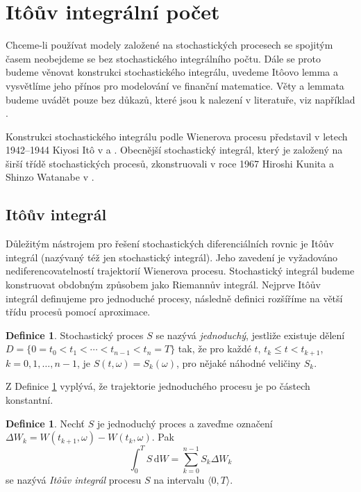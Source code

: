\documentclass[a4paper,12pt]{report}
\theoremstyle{definition} \newtheorem{definice}[veta]{Definice}
\theoremstyle{remark}
\begin{document}
\section{It\^oův integrální počet}\label{Ito_kalkul}
Chceme-li používat modely založené na stochastických procesech se spojitým časem neobejdeme se bez stochastického integrálního počtu.
Dále se proto budeme věnovat konstrukci stochastického integrálu, uvedeme It\^oovo lemma a vysvětlíme jeho přínos pro modelování ve finanční matematice.
Věty a lemmata budeme uvádět pouze bez důkazů, které jsou k nalezení v literatuře, viz například \cite{karatzas2012brownian}.

Konstrukci stochastického integrálu podle Wienerova procesu představil v letech 1942--1944 Kiyosi It\^o v \cite{ito1942differential} a \cite{ito1944}. 
Obecnější stochastický integrál, který je založený na širší třídě stochastických procesů, zkonstruovali v roce 1967 Hiroshi Kunita a Shinzo Watanabe v \cite{kunita1967square}.

\subsection{It\^oův integrál}\label{Ito_integral}
Důležitým nástrojem pro řešení stochastických diferenciálních rovnic je It\^oův integrál (nazývaný též jen stochastický integrál).
Jeho zavedení je vyžadováno nediferencovatelností trajektorií Wienerova procesu.
Stochastický integrál budeme konstruovat obdobným způsobem jako Riemannův integrál.
Nejprve It\^oův integrál definujeme pro jednoduché procesy, následně definici rozšíříme na větší třídu procesů pomocí aproximace.

\begin{definice}\label{jednoduchafunkce}
Stochastický proces $S$ se nazývá \textit{jednoduchý}, %
jestliže existuje dělení $D=\{0=t_0<t_1<\cdots<t_{n-1}<t_n=T\}$ tak, že pro každé $t$, $t_k\le t<t_{k+1}$, $k=0,1,\dots,n-1$, je $S(t,\omega)=S_k(\omega)$, pro nějaké náhodné veličiny $S_k$. 
\end{definice}
Z Definice \ref{jednoduchafunkce} vyplývá, že trajektorie jednoduchého procesu je po částech konstantní. 

\begin{definice}
Nechť $S$ je jednoduchý proces a zaveďme označení \linebreak$\Delta W_k=W(t_{k+1},\omega)-W(t_k,\omega)$.
Pak
$$\int_0^TS\,\mathrm{d}W=\sum_{k=0}^{n-1}S_k\Delta W_k$$
se nazývá \textit{It\^oův integrál} procesu $S$ na intervalu $\langle 0,T\rangle$.
\end{definice}
\end{document}
